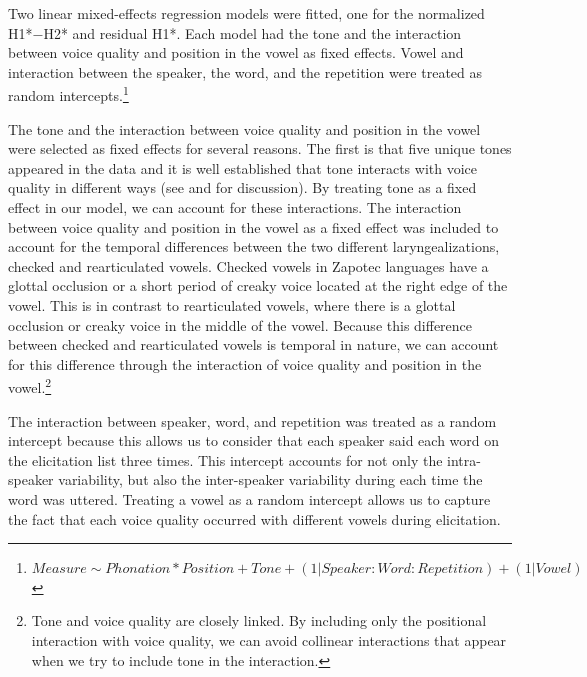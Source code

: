 Two linear mixed-effects regression models were fitted, one for the normalized H1*$-$H2* and residual H1*. Each model had the tone and the interaction between voice quality and position in the vowel as fixed effects. Vowel and interaction between the speaker, the word, and the repetition were treated as random intercepts.\footnote{ $Measure \sim  Phonation*Position + Tone + (1|Speaker:Word:Repetition) + (1|Vowel)$}

The tone and the interaction between voice quality and position in the vowel were selected as fixed effects for several reasons. The first is that five unique tones appeared in the data and it is well established that tone interacts with voice quality in different ways (see \cite{espositoCrosslinguisticPatternsPhonation2020} and \cite{garellekPhoneticsVoice2019} for discussion). By treating tone as a fixed effect in our model, we can account for these interactions. The interaction between voice quality and position in the vowel as a fixed effect was included to account for the temporal differences between the two different laryngealizations, checked and rearticulated vowels. Checked vowels in Zapotec languages have a glottal occlusion or a short period of creaky voice located at the right edge of the vowel. This is in contrast to rearticulated vowels, where there is a glottal occlusion or creaky voice in the middle of the vowel. Because this difference between checked and rearticulated vowels is temporal in nature, we can account for this difference through the interaction of voice quality and position in the vowel.\footnote{Tone and voice quality are closely linked. By including only the positional interaction with voice quality, we can avoid collinear interactions that appear when we try to include tone in the interaction.}

The interaction between speaker, word, and repetition was treated as a random intercept because this allows us to consider that each speaker said each word on the elicitation list three times. This intercept accounts for not only the intra-speaker variability, but also the inter-speaker variability during each time the word was uttered. Treating a vowel as a random intercept allows us to capture the fact that each voice quality occurred with different vowels during elicitation.


